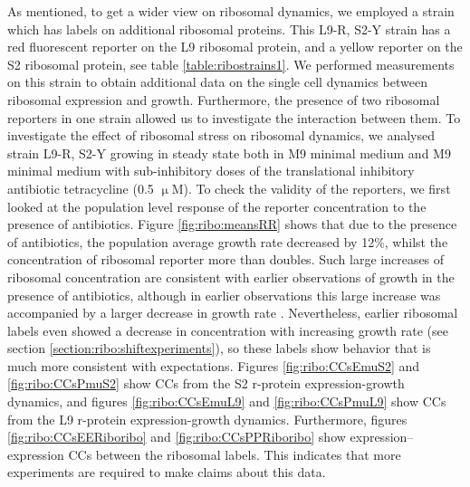 As mentioned, to get a wider view on ribosomal dynamics, we employed a strain which has labels on additional ribosomal proteins. 
%
This L9-R, S2-Y strain has a red fluorescent reporter on the L9 ribosomal protein, and a yellow reporter on the S2 ribosomal protein, see table \ref{table:ribostrains1}.
%
We performed measurements on this strain 
to obtain additional data 
on the single cell dynamics between ribosomal expression and growth.
%
Furthermore, the presence of two ribosomal reporters in one strain allowed us to investigate the interaction between them.
%
To investigate the effect of ribosomal stress on ribosomal dynamics, 
we analysed strain L9-R, S2-Y 
growing in steady state both in M9 minimal medium and M9 minimal medium with sub-inhibitory doses of the translational inhibitory antibiotic tetracycline (0.5 $\upmu$M).
%
To check the validity of the reporters, 
we first looked at the population level response of the reporter concentration to the presence of antibiotics.
Figure \ref{fig:ribo:meansRR} shows that due to the presence of antibiotics, the population average growth rate decreased by 12\%, whilst the concentration of ribosomal reporter more than doubles.
%
Such large increases of ribosomal concentration are consistent with earlier observations of growth in the presence of antibiotics, although in earlier observations this large increase was accompanied by a larger decrease in growth rate \cite{Hui2015}.
%
Nevertheless, earlier ribosomal labels even showed a decrease in concentration with increasing growth rate (see section \ref{section:ribo:shiftexperiments}), 
so these labels show behavior that is much more consistent with expectations.
%
Figures \ref{fig:ribo:CCsEmuS2} and \ref{fig:ribo:CCsPmuS2} show CCs from the S2 r-protein expression-growth dynamics, and 
figures \ref{fig:ribo:CCsEmuL9} and \ref{fig:ribo:CCsPmuL9} show CCs from the L9 r-protein expression-growth dynamics.
Furthermore, figures \ref{fig:ribo:CCsEERiboribo} and \ref{fig:ribo:CCsPPRiboribo} show expression--expression CCs between the ribosomal labels.
%
This indicates that more experiments are required to make claims about this data.




